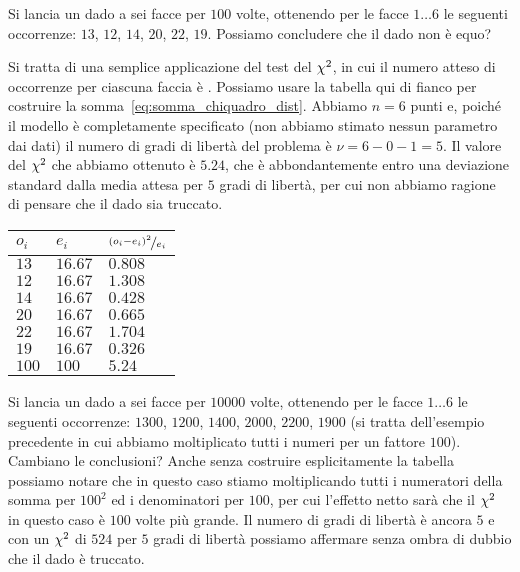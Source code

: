 \begin{examplebox}
  \begin{example}\label{exp:chi2_dado_1}
    Si lancia un dado a sei facce per $100$ volte, ottenendo per le facce
    $1 \ldots 6$ le seguenti occorrenze: $13$, $12$, $14$, $20$, $22$, $19$.
    Possiamo concludere che il dado non è equo?
    \begin{minipage}{0.65\textwidth}
      Si tratta di una semplice applicazione del test del $\chi^2$, in cui
      il numero atteso di occorrenze per ciascuna faccia è .
      Possiamo usare la tabella qui di fianco per costruire la
      somma~\eqref{eq:somma_chiquadro_dist}. Abbiamo $n = 6$ punti e, poiché
      il modello è completamente specificato (non abbiamo stimato nessun
      parametro dai dati) il numero di gradi di libertà del problema è
      $\nu = 6 - 0 - 1 = 5$. Il valore del $\chi^2$ che abbiamo ottenuto è
      $5.24$, che è abbondantemente entro una deviazione standard dalla media
      attesa per $5$ gradi di libertà, per cui non abbiamo ragione di pensare
      che il dado sia truccato.
    \end{minipage}\hfill\begin{minipage}[c]{0.3\textwidth}
    \begin{tabular}{lll}
        \hline
        $o_i$ & $e_i$ & $\nicefrac{(o_i - e_i)^2}{e_i}$\\
        \hline
        \hline
        $13$ & $16.67$ & $0.808$\\
        $12$ & $16.67$ & $1.308$\\
        $14$ & $16.67$ & $0.428$\\
        $20$ & $16.67$ & $0.665$\\
        $22$ & $16.67$ & $1.704$\\
        $19$ & $16.67$ & $0.326$\\
        \hline
        $100$ & $100$ & $5.24$\\
        \hline
      \end{tabular}
    \end{minipage}
  \end{example}

  \begin{example}\label{exp:chi2_dado_2}
    Si lancia un dado a sei facce per $10000$ volte, ottenendo per le facce
    $1 \ldots 6$ le seguenti occorrenze: $1300$, $1200$, $1400$, $2000$, $2200$,
    $1900$ (si tratta dell'esempio precedente in cui abbiamo moltiplicato tutti
    i numeri per un fattore $100$). Cambiano le conclusioni?
    Anche senza costruire esplicitamente la tabella possiamo notare che in
    questo caso stiamo moltiplicando tutti i numeratori della somma per $100^2$
    ed i denominatori per $100$, per cui l'effetto netto sarà che il $\chi^2$
    in questo caso è $100$ volte più grande. Il numero di gradi di
    libertà è ancora $5$ e con un $\chi^2$ di $524$ per $5$ gradi di
    libertà possiamo affermare senza ombra di dubbio che il dado è
    truccato.
  \end{example}
\end{examplebox}


